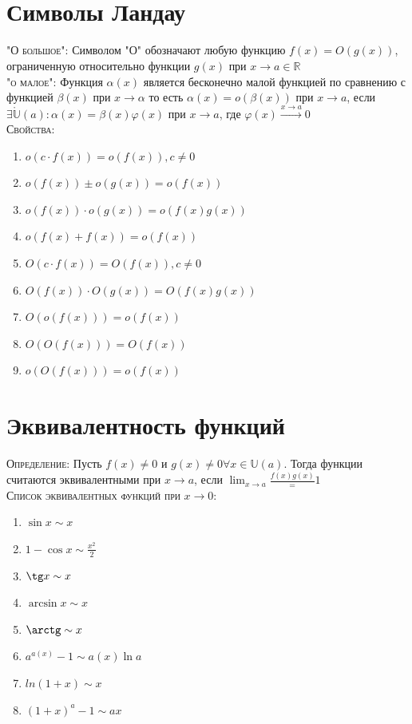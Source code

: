 \documentclass[14pt]{article}
\begin{document}
    \section{Символы Ландау}
        \textsc{"О большое":} Символом "О" обозначают любую функцию $f(x) = O(g(x))$, ограниченную относительно функции $g(x)$ при $x \rightarrow a \in \widehat{\mathbb{R}}$ \\
        \textsc{"о малое":} Функция $\alpha(x)$ является бесконечно малой функцией по сравнению с функцией $\beta(x)$ при $x \rightarrow \alpha$ то есть $\alpha(x) = o(\beta(x))$ при $x \rightarrow a$, если 
        $\exists \mathring{\mathbb{U}}(a) : \alpha(x) = \beta(x)\varphi(x)$ при $x \rightarrow a$, где $\varphi(x) \xrightarrow{x \rightarrow a} 0$ \\
        \textsc{Свойства:} 
        \begin{enumerate}
            \item $o(c\cdot f(x)) = o(f(x)), c\ne0 $
            \item $o(f(x)) \pm o(g(x)) = o(f(x))$
            \item $o(f(x)) \cdot o(g(x)) = o(f(x)g(x))$
            \item $o(f(x) + f(x)) = o(f(x))$
            \item $O(c\cdot f(x)) = O(f(x)), c\ne0 $
            \item $O(f(x)) \cdot O(g(x)) = O(f(x)g(x))$
            \item $O(o(f(x))) = o(f(x))$
            \item $O(O(f(x))) = O(f(x))$
            \item $o(O(f(x))) = o(f(x))$
        \end{enumerate}

    \section{Эквивалентность функций}
        \textsc{Определение:} Пусть $f(x) \ne 0 $ и $g(x) \ne 0 \forall x \in \mathbb{U} (a) $. Тогда функции считаются эквивалентными при $x \rightarrow a$, если $\lim_{x \rightarrow a } \frac{f(x){g(x)}} =1$ \\ 
        \textsc{Список эквивалентных функций при $x \rightarrow 0$:} \\ 
        \begin{enumerate}
            \item $\sin x \sim x$
            \item $1 - \cos x \sim \frac{x^2}{2}$
            \item $\tg x \sim x$
            \item $\arcsin x \sim x$
            \item $\arctg \sim x$
            \item $a^{a(x)} -1 \sim a(x) \ln a$
            \item $ln(1+x) \sim x$
            \item $(1+x)^a - 1 \sim ax$
        \end{enumerate}
\end{document}
